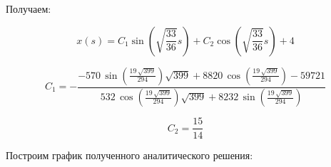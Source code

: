 \documentclass[14pt,a4paper]{scrartcl}
\begin{document}
Получаем:

\begin{equation*}
	x(s)=C_{1} \sin (\sqrt{\frac{33}{36}} s)+C_{2} \cos (\sqrt{\frac{33}{36}} s)+4
\end{equation*}

\begin{equation*}
C_1 = -{\frac {-570\,\sin \left( {\frac {19\,\sqrt {399}}{294}} \right) 
			\sqrt {399}+8820\,\cos \left( {\frac {19\,\sqrt {399}}{294}} \right) -
			59721}{532\,\cos \left( {\frac {19\,\sqrt {399}}{294}} \right) \sqrt {
				399}+8232\,\sin \left( {\frac {19\,\sqrt {399}}{294}} \right) }}
\end{equation*}

\begin{equation*}
	C_2  = \frac{15}{14}
\end{equation*}

Построим график полученного аналитического решения:

\begin{figure}[H]
	\begin{minipage}[h]{0.75\linewidth}
		  \\
	\end{minipage}
\end{figure}
\end{document}

